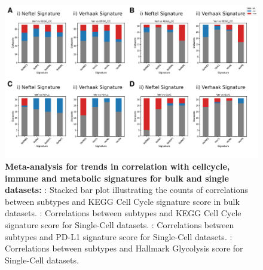 \documentclass[11pt,a4paper]{article}
\begin{document}
\begin{figure}[h]
    \begin{subfigure}[c]{\textwidth}
        \label{metacc}
    \end{subfigure}
    \begin{subfigure}[c]{\textwidth}
        \label{metasccc}
    \end{subfigure}
    \begin{subfigure}[c]{\textwidth}
        \label{metascpdl1}
    \end{subfigure}
    \begin{subfigure}[c]{\textwidth}
        \label{metascglyc}
    \end{subfigure}
    \centering
    \includegraphics[width=\textwidth]{figures/FigureS3}
    \caption{\textbf{Meta-analysis for trends in correlation with cellcycle, immune and metabolic signatures for bulk and single datasets:} : Stacked bar plot illustrating the counts of correlations between subtypes and KEGG Cell Cycle signature score in bulk datasets. : Correlations between subtypes and KEGG Cell Cycle signature score for Single-Cell datasets. : Correlations between subtypes and PD-L1 signature score for Single-Cell datasets. : Correlations between subtypes and Hallmark Glycolysis score for Single-Cell datasets.}
    \label{metaaxissupp}
\end{figure}
\end{document}
